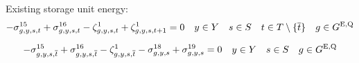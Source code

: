 \documentclass{article}
\begin{document}

Existing storage unit energy:
\begin{equation}
- \dNonNegativeStorageEnergy + \dMaxStorageEnergyExisting - \dStorageEnergyTransition + \dStorageEnergyTransition[\iGenerator,\iYear,\iScenario,\iInterval+1] = 0 \quad \iYear \in \sYears \quad \iScenario \in \sScenarios \quad \iInterval \in \sIntervals \setminus \{\iIntervalTerminal\} \quad \iGenerator \in \sStorageExisting
\end{equation}

\begin{equation}
- \dNonNegativeStorageEnergy[\iGenerator,\iYear,\iScenario,\iIntervalTerminal] + \dMaxStorageEnergyExisting[\iGenerator,\iYear,\iScenario,\iIntervalTerminal] - \dStorageEnergyTransition[\iGenerator,\iYear,\iScenario,\iIntervalTerminal] - \dMinStorageEnergyIntervalEnd + \dMaxStorageEnergyIntervalEnd = 0 \quad \iYear \in \sYears \quad \iScenario \in \sScenarios \quad \iGenerator \in \sStorageExisting
\end{equation}
\end{document}
